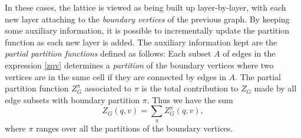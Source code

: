 %
%
%
%
%
%

In these cases, the lattice is viewed as being built up layer-by-layer, with each new layer attaching to the {\em boundary vertices} of the previous graph.  By keeping some auxiliary information, it is possible to incrementally update the partition function as each new layer is added. The auxiliary information kept are the {\em partial partition functions} defined as follows: Each subset $A$ of edges in the expression \eqref{zqv} determines a {\em partition} of the boundary vertices where two vertices are in the same cell if they are connected by edges in $A$. The partial partition function $Z_G^\pi$ associated to $\pi$ is the total contribution to $Z_G$ made by all edge subsets with boundary partition $\pi$. Thus we have the sum
\[
Z_G (q,v) = \sum_\pi Z_G^\pi (q,v),
\]
where $\pi$ ranges over all the partitions of the boundary vertices.

